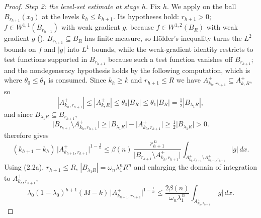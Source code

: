 \begin{proof}
\emph{Step 2: the level-set estimate at stage $h$.}  Fix $h$.  We apply
 on the ball $B_{r_{h+1}}(x_0)$ at the levels
$k_h\le k_{h+1}$.  Its hypotheses hold: $r_{h+1}>0$; $f\in W^{1,1}(B_{r_{h+1}})$
with weak gradient $g$, because $f\in W^{1,2}(B_R)$ with weak gradient $g$
(), $B_{r_{h+1}}\subseteq B_R$ has finite measure, so
H\"older's inequality turns the $L^2$ bounds on $f$ and $|g|$ into $L^1$ bounds,
while the weak-gradient identity restricts to test functions supported in
$B_{r_{h+1}}$ because such a test function vanishes off $B_{r_{h+1}}$; and the
nondegeneracy hypothesis holds by the following computation, which is where
$\theta_0\le\theta_1$ is consumed.  Since $k_h\ge k$ and $r_{h+1}\le R$ we have
$A^+_{k_h,r_{h+1}}\subseteq A^+_{k,R}$, so
\[
|A^+_{k_h,r_{h+1}}|\le|A^+_{k,R}|\le\theta_0|B_R|\le\theta_1|B_R|
=\tfrac12|B_{\lambda_1R}| ,
\]
and since $B_{\lambda_1R}\subseteq B_{r_{h+1}}$,
\[
\bigl|B_{r_{h+1}}\setminus A^+_{k_h,r_{h+1}}\bigr|
\ge\bigl|B_{\lambda_1R}\bigr|-\bigl|A^+_{k_h,r_{h+1}}\bigr|
\ge\tfrac12\bigl|B_{\lambda_1R}\bigr|>0 .
\tag{2.2a}
\]
 therefore gives
\[
(k_{h+1}-k_h)\,\bigl|A^+_{k_{h+1},r_{h+1}}\bigr|^{1-\frac1n}
\le\beta(n)\,\frac{r_{h+1}^{\,n}}{\bigl|B_{r_{h+1}}\setminus A^+_{k_h,r_{h+1}}\bigr|}
\int_{A^+_{k_h,r_{h+1}}\setminus A^+_{k_{h+1},r_{h+1}}}|g|\,dx .
\tag{2.2}
\]
Using (2.2a), $r_{h+1}\le R$, $|B_{\lambda_1R}|=\omega_n\lambda_1^nR^n$ and
enlarging the domain of integration to $A^+_{k_h,r_{h+1}}$,
\[
\lambda_0(1-\lambda_0)^{h+1}(M-k)\,\bigl|A^+_{k_{h+1},r_{h+1}}\bigr|^{1-\frac1n}
\le\frac{2\beta(n)}{\omega_n\lambda_1^{\,n}}\int_{A^+_{k_h,r_{h+1}}}|g|\,dx .
\tag{2.3}
\]


\end{proof}
